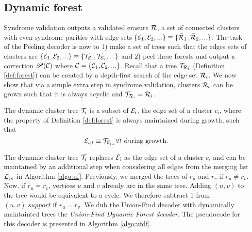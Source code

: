 
\subsection{Dynamic forest}\label{sec:dynamicforest}
Syndrome validation outputs a validated erasure $\bar{\mathcal{R}}$, a set of connected clusters with even syndrome parities with edge sets $\{\mathcal{E}_1, \mathcal{E}_2, ...\} \equiv \{\bar{\mathcal{R}}_1, \bar{\mathcal{R}}_2, ...\}$. The task of the Peeling decoder is now to 1) make a set of trees such that the edges sets of clusters are $\{\mathcal{E}_1, \mathcal{E}_2, ...\} \equiv \{\mathcal{T}_{\mathcal{E}_1}, \mathcal{T}_{\mathcal{E}_2}, ...\}$ and 2) peel these forests and output a correction $\mathscr{P}(\mathcal{C})$ where $\mathcal{C} = \{\mathcal{C}_1, \mathcal{C}_2,...\}$. Recall that a tree $\mathcal{T}_{\mathcal{R}_i}$ (Definition \ref{def:forest}) can be created by a depth-first search of the edge set $\mathcal{R}_i$. We now show that via a simple extra step in syndrome validation, clusters $\mathcal{R}_i$ can be grown such that it is always acyclic and $\mathcal{T}_{\mathcal{R}_i} = \mathcal{R}_i$. 

\begin{definition}
  The dynamic cluster tree $\mathcal{T}_i$ is a subset of $\mathcal{E}_i$, the edge set of a cluster $c_i$, where the property of Definition \ref{def:forest} is always maintained during growth, such that
  \begin{equation}
    \mathcal{E}_{i,t}\equiv\mathcal{T}_{\mathcal{E}_{i,t}} \forall t \text{ during growth}.
  \end{equation}
\end{definition}
The dynamic cluster tree $\mathcal{T}_i$ replaces $\mathcal{E}_i$ as the edge set of a cluster $c_i$ and can be maintained by an additional step when considering all edges from the merging list $\mathcal{L}_m$ in Algorithm \ref{algo:uf}. Previously, we merged the trees of $r_u$ and $r_v$ if $r_u \neq r_v$. Now, if $r_u = r_v$, vertices $u$ and $v$ already are in the same tree. Adding $(u,v)$ to the tree would be equivalent to a cycle. We therefore subtract 1 from $(u,v).support$ if $r_u = r_v$. We dub the Union-Find decoder with dynamically maintainted trees the \emph{Union-Find Dynamic Forest decoder}. The pseudocode for this decoder is presented in Algorithm \ref{algo:ufdf}.

